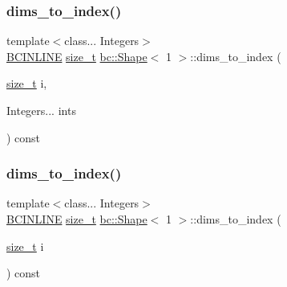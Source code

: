 \mbox{\label{structbc_1_1Shape_3_011_01_4_ac032ca126796c032c89cba55cace7400}} 
\subsubsection{\texorpdfstring{dims\+\_\+to\+\_\+index()}{dims\_to\_index()}\hspace{0.1cm}{\footnotesize\ttfamily [1/2]}}
{\footnotesize\ttfamily template$<$class... Integers$>$ \\
\hyperlink{common_8h_a6699e8b0449da5c0fafb878e59c1d4b1}{B\+C\+I\+N\+L\+I\+NE} \hyperlink{structbc_1_1Shape_3_011_01_4_a7ab1c3926651c49d726655dbaa5dc0a3}{size\+\_\+t} \hyperlink{structbc_1_1Shape}{bc\+::\+Shape}$<$ 1 $>$\+::dims\+\_\+to\+\_\+index (\begin{DoxyParamCaption}\item[{\hyperlink{structbc_1_1Shape_3_011_01_4_a7ab1c3926651c49d726655dbaa5dc0a3}{size\+\_\+t}}]{i,  }\item[{Integers...}]{ints }\end{DoxyParamCaption}) const\hspace{0.3cm}{\ttfamily [inline]}}

\mbox{\label{structbc_1_1Shape_3_011_01_4_a4bf8a25cfe38871e375de2d69eae57f8}} 
\subsubsection{\texorpdfstring{dims\+\_\+to\+\_\+index()}{dims\_to\_index()}\hspace{0.1cm}{\footnotesize\ttfamily [2/2]}}
{\footnotesize\ttfamily template$<$class... Integers$>$ \\
\hyperlink{common_8h_a6699e8b0449da5c0fafb878e59c1d4b1}{B\+C\+I\+N\+L\+I\+NE} \hyperlink{structbc_1_1Shape_3_011_01_4_a7ab1c3926651c49d726655dbaa5dc0a3}{size\+\_\+t} \hyperlink{structbc_1_1Shape}{bc\+::\+Shape}$<$ 1 $>$\+::dims\+\_\+to\+\_\+index (\begin{DoxyParamCaption}\item[{\hyperlink{structbc_1_1Shape_3_011_01_4_a7ab1c3926651c49d726655dbaa5dc0a3}{size\+\_\+t}}]{i }\end{DoxyParamCaption}) const\hspace{0.3cm}{\ttfamily [inline]}}


